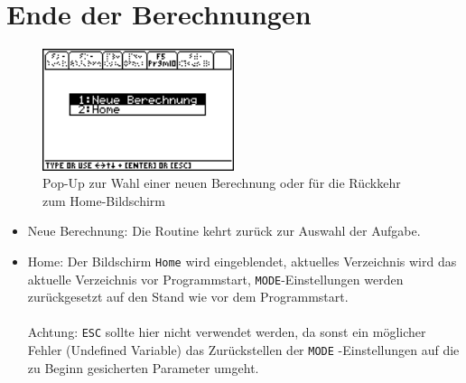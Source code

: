 \documentclass[a4paper,10pt]{scrreprt}
\begin{document}
\section{Ende der Berechnungen}
\begin{figure}[h]
  \centering
  \includegraphics[width=0.5\textwidth]{img/nummeth_image048.png}
  \caption[Pop-Up Neue Berechnung oder Home]{Pop-Up zur Wahl einer neuen Berechnung oder f\"ur die R\"uckkehr zum Home-Bildschirm}
  \label{fig:NeueBerechnung}
\end{figure}
\begin{itemize}
  \item Neue Berechnung: Die Routine kehrt zur\"uck zur Auswahl der Aufgabe.
  \item Home: Der Bildschirm \verb|Home| wird eingeblendet, aktuelles Verzeichnis wird das aktuelle Verzeichnis vor Programmstart, \verb|MODE|-Einstellungen werden zur\"uckgesetzt auf den Stand wie vor dem Programmstart.
  \\\vspace{5pt}
  \\Achtung: \verb|ESC| sollte hier nicht verwendet werden, da sonst ein m\"oglicher Fehler (Undefined Variable) das Zur\"uckstellen der \verb|MODE| -Einstellungen auf die zu Beginn gesicherten Parameter umgeht.
\end{itemize}
\end{document}
